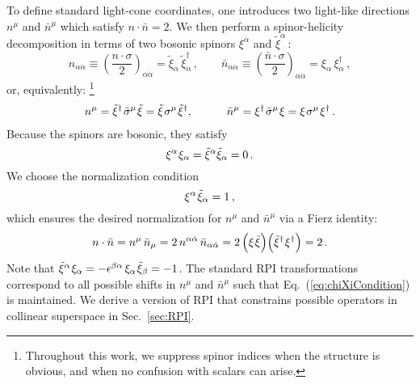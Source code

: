 \documentclass[12pt,document,nofootinbib,superscriptaddress,onecolumn,preprintnumbers,balancelastpage]{article}
\newcommand{\s}{\hspace{0.8pt}}
\DeclareRobustCommand{\Sec}[1]{Sec.~\ref{#1}}
\DeclareRobustCommand{\Eq}[1]{Eq.~(\ref{#1})}
\begin{document}
\begin{spacing}{1.2}
To define standard light-cone coordinates, one introduces two light-like directions $n^\mu$ and $\bar{n}^\mu$ which satisfy $n \cdot \bar{n} = 2$.
%
We then perform a spinor-helicity decomposition in terms of two bosonic spinors $\xi^\alpha$ and $\tilde{\xi}^\alpha$\,: 
%
\begin{equation}
\label{eq:twospinorsn_alt}
n_{\alpha \dot{\alpha}} \equiv \left( \frac{n\cdot \sigma}{2} \right)_{\alpha \dot{\alpha}} = \tilde{\xi}_\alpha\, \tilde{\xi}^{\dagger}_{\dot{\alpha}}\,, \qquad \bar{n}_{\alpha \dot{\alpha}} \equiv \left( \frac{\bar{n}\cdot \sigma}{2} \right)_{\alpha \dot{\alpha}} = \xi_\alpha\, \xi^{\dagger}_{\dot{\alpha}}\,,
\end{equation}
%
or, equivalently:%
%
\footnote{Throughout this work, we suppress spinor indices when the structure is obvious, and when no confusion with scalars can arise.}
%
\begin{align}
\label{eq:twospinorsn}
n^\mu = \tilde{\xi}^\dagger\s \bar{\sigma}^\mu\s \tilde{\xi} = \tilde{\xi} \s\sigma^\mu\s \tilde{\xi}^\dagger, \quad\qquad \bar{n}^\mu = \xi^\dagger\s \bar{\sigma}^\mu\s \xi  = \xi\s \sigma^\mu\s \xi^\dagger\,.
\end{align}
%
Because the spinors are bosonic, they satisfy
\begin{equation}
\xi^\alpha\s \xi_\alpha = \tilde{\xi}^\alpha \tilde{\xi}_\alpha = 0\,.
\end{equation}
%
We choose the normalization condition
%
\begin{equation}
\xi^\alpha\s \tilde{\xi}_\alpha = 1\,,
\end{equation}
%
which ensures the desired normalization for $n^\mu$ and $\bar{n}^\mu$ via a Fierz identity:
%
\begin{align}
\label{eq:chiXiCondition}
n \cdot \bar{n} = n^\mu \,\bar{n}_\mu = 2 \, n^{\alpha \dot{\alpha}}\, \bar{n}_{\alpha \dot{\alpha}} = 2\,\Big(\xi \s\tilde{\xi} \Big)\Big( \tilde{\xi}^\dag\s \xi^\dag \Big) = 2\,.
\end{align}
%
Note that $ \tilde{\xi}^ \alpha\s \xi_\alpha = - \epsilon^{ \beta \alpha}\, \xi_\alpha\s  \tilde{\xi}_\beta  = -1$.
The standard RPI transformations correspond to all possible shifts in $n^\mu$ and $\bar{n}^\mu$ such that \Eq{eq:chiXiCondition} is maintained. We derive a version of RPI that constrains possible operators in collinear superspace in \Sec{sec:RPI}.


\end{spacing}
\end{document}
